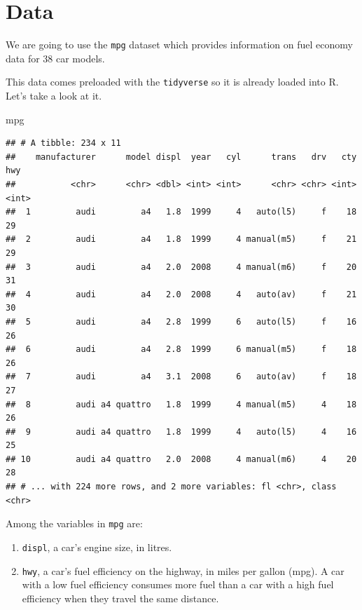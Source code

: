 \documentclass[]{book}
\newenvironment{Shaded}{\begin{snugshade}}{\end{snugshade}}
\newcommand{\NormalTok}[1]{#1}
\theoremstyle{definition}
\theoremstyle{definition}
\theoremstyle{definition}
\theoremstyle{remark}
\begin{document}
\section{Data}\label{data}

We are going to use the \texttt{mpg} dataset which provides information
on fuel economy data for 38 car models.

This data comes preloaded with the \texttt{tidyverse} so it is already
loaded into R. Let's take a look at it.

\begin{Shaded}
\begin{Highlighting}[]
\NormalTok{mpg}
\end{Highlighting}
\end{Shaded}

\begin{verbatim}
## # A tibble: 234 x 11
##    manufacturer      model displ  year   cyl      trans   drv   cty   hwy
##           <chr>      <chr> <dbl> <int> <int>      <chr> <chr> <int> <int>
##  1         audi         a4   1.8  1999     4   auto(l5)     f    18    29
##  2         audi         a4   1.8  1999     4 manual(m5)     f    21    29
##  3         audi         a4   2.0  2008     4 manual(m6)     f    20    31
##  4         audi         a4   2.0  2008     4   auto(av)     f    21    30
##  5         audi         a4   2.8  1999     6   auto(l5)     f    16    26
##  6         audi         a4   2.8  1999     6 manual(m5)     f    18    26
##  7         audi         a4   3.1  2008     6   auto(av)     f    18    27
##  8         audi a4 quattro   1.8  1999     4 manual(m5)     4    18    26
##  9         audi a4 quattro   1.8  1999     4   auto(l5)     4    16    25
## 10         audi a4 quattro   2.0  2008     4 manual(m6)     4    20    28
## # ... with 224 more rows, and 2 more variables: fl <chr>, class <chr>
\end{verbatim}

Among the variables in \texttt{mpg} are:

\begin{enumerate}
\def\labelenumi{\arabic{enumi}.}
\item
  \texttt{displ}, a car's engine size, in litres.
\item
  \texttt{hwy}, a car's fuel efficiency on the highway, in miles per
  gallon (mpg). A car with a low fuel efficiency consumes more fuel than
  a car with a high fuel efficiency when they travel the same distance.
\end{enumerate}
\end{document}
